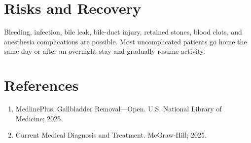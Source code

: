 \section*{Risks and Recovery}
Bleeding, infection, bile leak, bile-duct injury, retained stones, blood clots, and anesthesia complications are possible. Most uncomplicated patients go home the same day or after an overnight stay and gradually resume activity.

\section*{References}
\begin{enumerate}
  \item MedlinePlus. Gallbladder Removal---Open. U.S. National Library of Medicine; 2025.
  \item Current Medical Diagnosis and Treatment. McGraw-Hill; 2025.
\end{enumerate}
\clearpage
